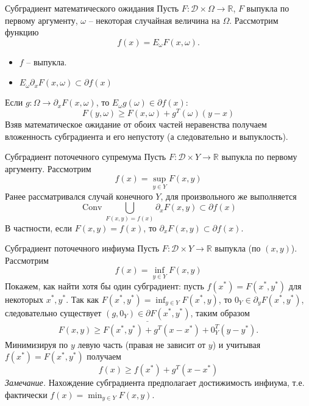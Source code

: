 \documentclass[10pt, handout]{beamer}
\DeclareMathOperator{\conv}{Conv}
\begin{document}
\begin{frame}{Субградиент математического ожидания}
Пусть $F:\mathcal{D}\times \Omega\rightarrow \mathbb{R}$, $F$ выпукла по первому аргументу, $\omega$ -- некоторая случайная величина на $\Omega$. Рассмотрим функцию
$$
f(x)=E_\omega F(x, \omega).
$$
\pause
\begin{itemize}[<+->]
\item $f$ -- выпукла.
\item 
$E_\omega \partial_x F(x, \omega)\subset \partial f(x)$
\end{itemize}
\pause
Если $g:\Omega\rightarrow \partial_x F(x,\omega)$, то $E_\omega g(\omega)\in \partial f(x)$:
$$
F(y, \omega)\geq F(x,\omega)+g^T(\omega)(y-x)
$$
Взяв математическое ожидание от обоих частей неравенства получаем вложенность субградиента и его непустоту (а следовательно и выпуклость).
\end{frame}

\begin{frame}{Субградиент поточечного супремума}
Пусть $F:\mathcal{D}\times Y\rightarrow \mathbb{R}$ выпукла по первому аргументу. Рассмотрим
$$
f(x)=\sup_{y\in Y}F(x, y)
$$
Ранее рассматривался случай конечного $Y$, для произвольного же выполняется 
$$
\conv\bigcup_{F(x,y)=f(x)}\partial_x F(x, y)\subset \partial f(x)
$$
В частности, если $F(x, y)=f(x)$, то $\partial_x F(x,y)\subset \partial f(x)$.
\end{frame}

\begin{frame}{Субградиент поточечного инфиума}
Пусть $F:\mathcal{D}\times Y\rightarrow \mathbb{R}$ выпукла (по $(x, y)$). Рассмотрим
$$
f(x)=\inf_{y\in Y}F(x, y)
$$
\pause
Покажем, как найти хотя бы один субградиент: пусть $f(x^*)=F(x^*, y^*)$ для некоторых $x^*, y^*$. Так как $F(x^*, y^*)=\inf_{y\in Y}F(x^*,y)$, то $0_Y\in\partial_y F(x^*, y^*)$, следовательно существует $\underline{(g,0_Y)\in \partial F(x^*,y^*)}$, \pause таким образом
\begin{align*}
F(x,y)\geq F(x^*, y^*)+g^T(x-x^*)+0^T_Y(y-y^*).
\end{align*}
\pause
Минимизируя по $y$ левую часть (правая не зависит от $y$) и учитывая $f(x^*)=F(x^*, y^*)$ получаем
$$
f(x)\geq f(x^*)+g^T(x-x^*) 
$$
\textit{Замечание.} Нахождение субградиента предполагает достижимость инфиума, т.е. фактически $f(x)=\min_{y\in Y}F(x, y)$.
\end{frame}
\end{document}
